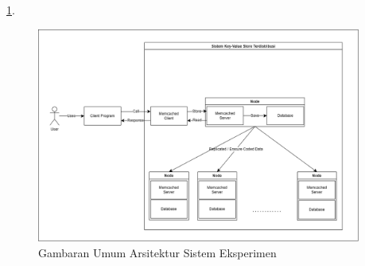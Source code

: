 \ref{fig:general-architecture}.
  
\begin{figure}[ht]
    \centering
    \includegraphics[width=0.95\textwidth]{resources/chapter-3/general-architecture.png}
    \caption{Gambaran Umum Arsitektur Sistem Eksperimen}
    \label{fig:general-architecture}
  \end{figure}